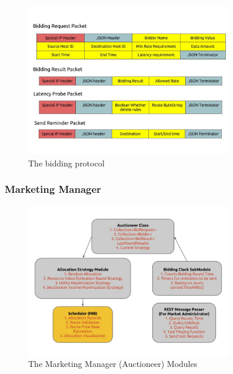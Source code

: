 \documentclass[a4paper,11pt,twocolumn]{article}
\begin{document}
\begin{figure}[ht!]
\centering
\includegraphics[width=90mm]{protocol.jpg}
\caption{The bidding protocol}
\label{overflow}
\end{figure}

\subsubsection{Marketing Manager}

\begin{figure}[ht!]
\centering
\includegraphics[width=90mm]{core.jpg}
\caption{The Marketing Manager (Auctioneer) Modules}
\label{overflow}
\end{figure}
\end{document}
